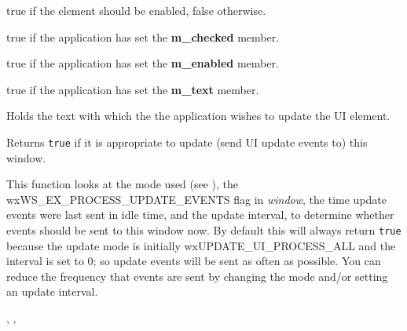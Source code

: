 
true if the element should be enabled, false otherwise.

\label{wxupdateuieventmsetchecked}


true if the application has set the {\bf m\_checked} member.

\label{wxupdateuieventmsetenabled}


true if the application has set the {\bf m\_enabled} member.

\label{wxupdateuieventmsettext}


true if the application has set the {\bf m\_text} member.

\label{wxupdateuieventmtext}


Holds the text with which the the application wishes to
update the UI element.

\label{wxupdateuieventcanupdate}


Returns {\tt true} if it is appropriate to update (send UI update events to)
this window.

This function looks at the mode used (see ),
the wxWS\_EX\_PROCESS\_UPDATE\_EVENTS flag in {\it window},
the time update events were last sent in idle time, and
the update interval, to determine whether events should be sent to
this window now. By default this will always return {\tt true} because
the update mode is initially wxUPDATE\_UI\_PROCESS\_ALL and
the interval is set to 0; so update events will be sent as
often as possible. You can reduce the frequency that events
are sent by changing the mode and/or setting an update interval.


, 
, 

